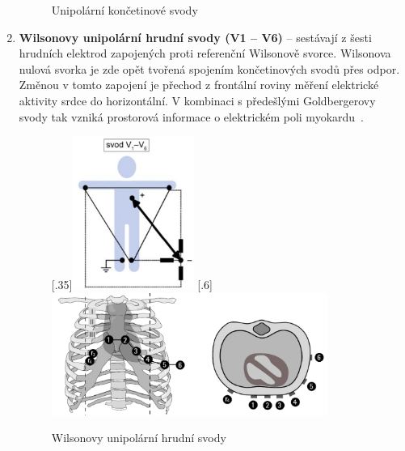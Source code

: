 \begin{enumerate}
\begin{figure}[H]
\begin{center}
			      \caption{Unipolární končetinové svody~\cite{Kittnar2020}}
			      \label{fig:unipolar1}
		      \end{center}
	      \end{figure}
	\item \textbf{Wilsonovy unipolární hrudní svody (V1 -- V6)} -- sestávají z
	      šesti hrudních elektrod zapojených proti referenční Wilsonově svorce.
	      Wilsonova nulová svorka je zde opět tvořená spojením končetinových
	      svodů přes odpor. Změnou v tomto zapojení je přechod z frontální
	      roviny měření elektrické aktivity srdce do horizontální. V kombinaci s
	      předešlými Goldbergerovy svody tak vzniká prostorová informace o
	      elektrickém poli myokardu~\cite{Kittnar2020}.
	      \begin{figure}[h]
		      \centering
		      [.35\linewidth]{\includegraphics[height=5cm]{../assets/anatomy/unipolar2}}
		      \hfill
			      [.6\linewidth]{\includegraphics[height=4cm]{../assets/anatomy/unipolar3}}
		      \caption{Wilsonovy unipolární hrudní svody}
		      \label{fig:wilson}
	      \end{figure}
\end{enumerate}

